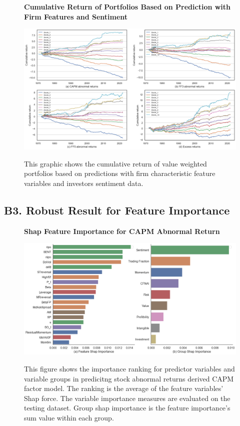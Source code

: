 \begin{figure}[H]
  \centering
  \caption{\textbf{Cumulative Return of Portfolios Based on Prediction with Firm Features and Sentiment}}
  \includegraphics[width=.8\textwidth]{images/vw_portfolios_cumulative_return_sent.png}
  \label{fig: portfolios cum return firm features and sent}
  \caption*{\footnotesize{This graphic shows the cumulative return of value weighted portfolios based on predictions with firm characteristic feature variables and investors sentiment data.}}
\end{figure}

\subsection*{B3. Robust Result for Feature Importance}
\label{sec:appendixb3}

\begin{figure}[H]
  \centering
  \caption{\textbf{Shap Feature Importance for CAPM Abnormal Return}}
  \includegraphics[width=.8\textwidth]{images/shap_feature_importance_capm.png}
  \label{fig: feature importance capm}
  \caption*{\footnotesize{This figure shows the importance ranking for predictor variables and variable groups in predicitng stock abnormal returns derived CAPM factor model. The ranking is the average of the feature variables' Shap force. The variable importance measures are evaluated on the testing dataset. Group shap importance is the feature importance's sum value within each group.}}
\end{figure}

